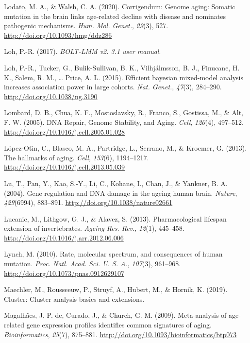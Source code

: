 \documentclass[12pt,twoside]{unicam}
\begin{document}
\begin{cslreferences}
\leavevmode\hypertarget{ref-Lodato2020}{}%
Lodato, M. A., \& Walsh, C. A. (2020). Corrigendum: Genome aging: Somatic mutation in the brain links age-related decline with disease and nominates pathogenic mechanisms. \emph{Hum. Mol. Genet.}, \emph{29}(3), 527. \url{http://doi.org/10.1093/hmg/ddz286}

\leavevmode\hypertarget{ref-Loh2017}{}%
Loh, P.-R. (2017). \emph{BOLT-LMM v2. 3.1 user manual}.

\leavevmode\hypertarget{ref-Loh2015}{}%
Loh, P.-R., Tucker, G., Bulik-Sullivan, B. K., Vilhjálmsson, B. J., Finucane, H. K., Salem, R. M., \ldots{} Price, A. L. (2015). Efficient bayesian mixed-model analysis increases association power in large cohorts. \emph{Nat. Genet.}, \emph{47}(3), 284--290. \url{http://doi.org/10.1038/ng.3190}

\leavevmode\hypertarget{ref-Lombard2005}{}%
Lombard, D. B., Chua, K. F., Mostoslavsky, R., Franco, S., Gostissa, M., \& Alt, F. W. (2005). DNA Repair, Genome Stability, and Aging. \emph{Cell}, \emph{120}(4), 497--512. \url{http://doi.org/10.1016/j.cell.2005.01.028}

\leavevmode\hypertarget{ref-Lopez-Otin2013}{}%
López-Otı́n, C., Blasco, M. A., Partridge, L., Serrano, M., \& Kroemer, G. (2013). The hallmarks of aging. \emph{Cell}, \emph{153}(6), 1194--1217. \url{http://doi.org/10.1016/j.cell.2013.05.039}

\leavevmode\hypertarget{ref-Lu2004}{}%
Lu, T., Pan, Y., Kao, S.-Y., Li, C., Kohane, I., Chan, J., \& Yankner, B. A. (2004). Gene regulation and DNA damage in the ageing human brain. \emph{Nature}, \emph{429}(6994), 883--891. \url{http://doi.org/10.1038/nature02661}

\leavevmode\hypertarget{ref-Lucanic2013}{}%
Lucanic, M., Lithgow, G. J., \& Alavez, S. (2013). Pharmacological lifespan extension of invertebrates. \emph{Ageing Res. Rev.}, \emph{12}(1), 445--458. \url{http://doi.org/10.1016/j.arr.2012.06.006}

\leavevmode\hypertarget{ref-Lynch2010}{}%
Lynch, M. (2010). Rate, molecular spectrum, and consequences of human mutation. \emph{Proc. Natl. Acad. Sci. U. S. A.}, \emph{107}(3), 961--968. \url{http://doi.org/10.1073/pnas.0912629107}

\leavevmode\hypertarget{ref-Maechler2019}{}%
Maechler, M., Rousseeuw, P., Struyf, A., Hubert, M., \& Hornik, K. (2019). Cluster: Cluster analysis basics and extensions.

\leavevmode\hypertarget{ref-deMagalhaes2009}{}%
Magalhães, J. P. de, Curado, J., \& Church, G. M. (2009). Meta-analysis of age-related gene expression profiles identifies common signatures of aging. \emph{Bioinformatics}, \emph{25}(7), 875--881. \url{http://doi.org/10.1093/bioinformatics/btp073}


\end{cslreferences}
\end{document}
